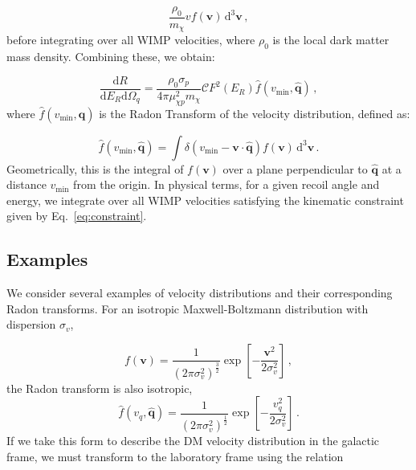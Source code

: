 \begin{equation}
\frac{\rho_0}{m_\chi} v f(\textbf{v}) \, \textrm{d}^3 \textbf{v}\,,
\end{equation}
before integrating over all WIMP velocities, where \(\rho_0\) is the local dark matter mass density. Combining these, we obtain:

\begin{equation}
\frac{\textrm{d}R}{\textrm{d}E_R \textrm{d}\Omega_q} = \frac{\rho_0 \sigma_p}{4\pi \mu_{\chi p}^2 m_\chi} \mathcal{C} F^2(E_R) \hat{f}\left(v_\textrm{min},\hat{\textbf{q}}\right)\,,
\end{equation}
where \(\hat{f}\left(v_\textrm{min},\hat{\textbf{q}}\right)\) is the Radon Transform of the velocity distribution, defined as:

\begin{equation}
\hat{f}\left(v_\textrm{min},\hat{\textbf{q}}\right) = \int \delta\left(v_\textrm{min} - \textbf{v}\cdot\hat{\textbf{q}}\right) f(\textbf{v}) \,\textrm{d}^3\textbf{v}\,.
\end{equation}
Geometrically, this is the integral of \(f(\textbf{v})\) over a plane perpendicular to \(\hat{\textbf{q}}\) at a distance \(v_\textrm{min}\) from the origin. In physical terms, for a given recoil angle and energy, we integrate over all WIMP velocities satisfying the kinematic constraint given by Eq.\ \ref{eq:constraint}.

\subsection{Examples}

We consider several examples of velocity distributions and their corresponding Radon transforms. For an isotropic Maxwell-Boltzmann distribution with dispersion $\sigma_v$,

\begin{equation}
f(\textbf{v}) = \frac{1}{(2\pi \sigma_v^2)^{\frac{3}{2}}} \exp \left[ -\frac{\textbf{v}^2}{2 \sigma_v^2}\right]\,,
\end{equation}
the Radon transform is also isotropic,
\begin{equation}
\hat{f}(v_q,\hat{\textbf{q}}) = \frac{1}{(2\pi \sigma_v^2)^{\frac{1}{2}}} \exp \left[ -\frac{v_q^2}{2 \sigma_v^2}\right]\,.
\end{equation}
If we take this form to describe the DM velocity distribution in the galactic frame, we must transform to the laboratory frame using the relation \cite{Gondolo:2002}

